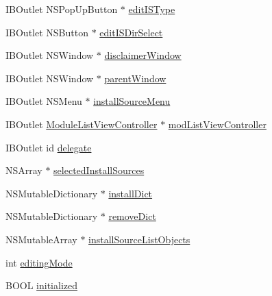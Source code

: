 \begin{DoxyCompactItemize}
\item 
I\-B\-Outlet N\-S\-Pop\-Up\-Button $\ast$ \hyperlink{interface_module_manage_view_controller_aae2a8bcbae0ad8af6236ae8f4600db88}{edit\-I\-S\-Type}
\item 
I\-B\-Outlet N\-S\-Button $\ast$ \hyperlink{interface_module_manage_view_controller_ab6c958b8ade721de0eb11e4ee4bfa56b}{edit\-I\-S\-Dir\-Select}
\item 
I\-B\-Outlet N\-S\-Window $\ast$ \hyperlink{interface_module_manage_view_controller_a603faa25b9a52525b859f1975b07f570}{disclaimer\-Window}
\item 
I\-B\-Outlet N\-S\-Window $\ast$ \hyperlink{interface_module_manage_view_controller_a16e8470294ab6af9bb98d8336adcdc36}{parent\-Window}
\item 
I\-B\-Outlet N\-S\-Menu $\ast$ \hyperlink{interface_module_manage_view_controller_a79edfe4f7877b55d0d6b77ebbeca5f30}{install\-Source\-Menu}
\item 
I\-B\-Outlet \hyperlink{interface_module_list_view_controller}{Module\-List\-View\-Controller} $\ast$ \hyperlink{interface_module_manage_view_controller_a8c43ea19910fa60600028ab23f7298c8}{mod\-List\-View\-Controller}
\item 
I\-B\-Outlet id \hyperlink{interface_module_manage_view_controller_a9f85cc570ea673f3b6001f8509d4bb11}{delegate}
\item 
N\-S\-Array $\ast$ \hyperlink{interface_module_manage_view_controller_a8973007d714a25dc92972d62e09dc726}{selected\-Install\-Sources}
\item 
N\-S\-Mutable\-Dictionary $\ast$ \hyperlink{interface_module_manage_view_controller_a907b2eaa97db1f35d034cb1625ff25a5}{install\-Dict}
\item 
N\-S\-Mutable\-Dictionary $\ast$ \hyperlink{interface_module_manage_view_controller_a6092088ba4a960f7f295d9e7c6267d9d}{remove\-Dict}
\item 
N\-S\-Mutable\-Array $\ast$ \hyperlink{interface_module_manage_view_controller_ae49cc77a92bcaab294c2da615bb85d34}{install\-Source\-List\-Objects}
\item 
int \hyperlink{interface_module_manage_view_controller_a367c8b3d9aa5f7bb16da8cb7dbb6e942}{editing\-Mode}
\item 
B\-O\-O\-L \hyperlink{interface_module_manage_view_controller_ac3eb467e632e7bda8500fc927a61ab40}{initialized}
\end{DoxyCompactItemize}


